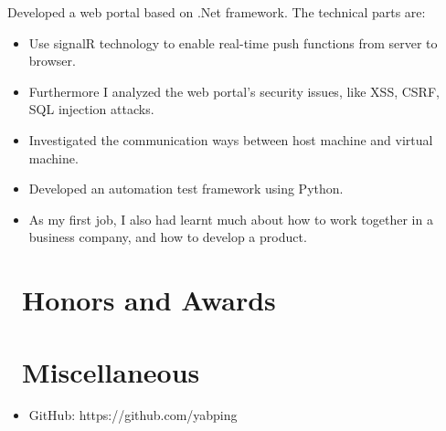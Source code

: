 \documentclass{resume}
\begin{document}
Developed a web portal based on .Net framework. The technical parts are:
\begin{itemize}
  \item Use signalR technology to enable real-time push functions from server to browser.
  \item Furthermore I analyzed the web portal’s security issues, like XSS, CSRF, SQL injection attacks.
\end{itemize}

\begin{itemize}
  \item Investigated the communication ways between host machine and virtual machine. 
  \item Developed an automation test framework using Python. 
  \item As my first job, I also had learnt much about how to work together in a business company, and how to develop a product.
\end{itemize}



\section{\faHeartO\ Honors and Awards}

\section{\faInfo\ Miscellaneous}
\begin{itemize}[parsep=0.5ex]
  \item GitHub: https://github.com/yabping
\end{itemize}

%
%
\end{document}
